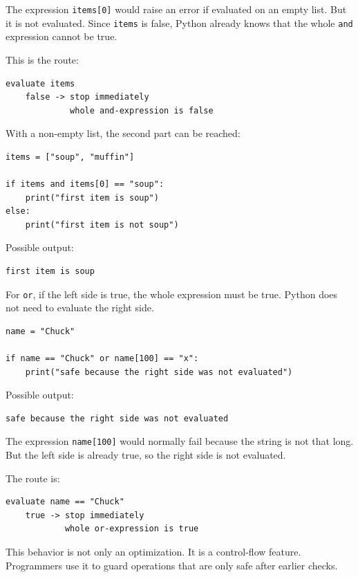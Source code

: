 The expression \texttt{items[0]} would raise an error if evaluated on an empty list. But it is not evaluated. Since \texttt{items} is false, Python already knows that the whole \texttt{and} expression cannot be true.

This is the route:

\begin{verbatim}
evaluate items
    false -> stop immediately
             whole and-expression is false
\end{verbatim}

With a non-empty list, the second part can be reached:

\begin{verbatim}
items = ["soup", "muffin"]

if items and items[0] == "soup":
    print("first item is soup")
else:
    print("first item is not soup")
\end{verbatim}

Possible output:

\begin{verbatim}
first item is soup
\end{verbatim}

For \texttt{or}, if the left side is true, the whole expression must be true. Python does not need to evaluate the right side.

\begin{verbatim}
name = "Chuck"

if name == "Chuck" or name[100] == "x":
    print("safe because the right side was not evaluated")
\end{verbatim}

Possible output:

\begin{verbatim}
safe because the right side was not evaluated
\end{verbatim}

The expression \texttt{name[100]} would normally fail because the string is not that long. But the left side is already true, so the right side is not evaluated.

The route is:

\begin{verbatim}
evaluate name == "Chuck"
    true -> stop immediately
            whole or-expression is true
\end{verbatim}

This behavior is not only an optimization. It is a control-flow feature. Programmers use it to guard operations that are only safe after earlier checks.


